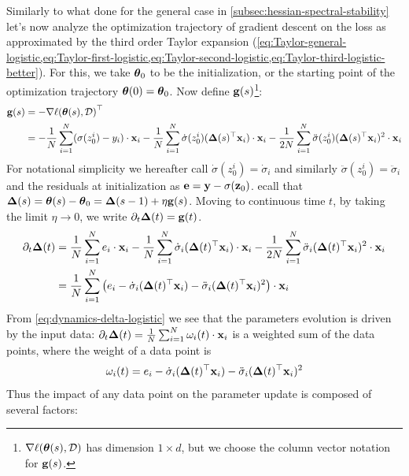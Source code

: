 \documentclass{article} %
\begin{document}
Similarly to what done for the general case in \cref{subsec:hessian-spectral-stability} let's now analyze the optimization trajectory of gradient descent on the loss as approximated by the third order Taylor expansion (\cref{eq:Taylor-general-logistic,eq:Taylor-first-logistic,eq:Taylor-second-logistic,eq:Taylor-third-logistic-better}). For this, we take $\mbox{$\mbox{$\boldsymbol{\theta}$}$}_0$ to be the initialization, or the starting point of the optimization trajectory $\mbox{$\mbox{$\boldsymbol{\theta}$}$}(0) = \mbox{$\mbox{$\boldsymbol{\theta}$}$}_0$. Now define $\mbox{$\mbox{$\mathbf{g}$}$}(s)$\footnote{$\nabla{\ell(\mbox{$\mbox{$\boldsymbol{\theta}$}$}(s),\mbox{${\cal D}$})}$ has dimension $1\times d$, but we choose the column vector notation for $\mbox{$\mbox{$\mathbf{g}$}$}(s)$.}: 
\begin{align}
    \mbox{$\mbox{$\mathbf{g}$}$}(s) 
    &= -\nabla{\ell(\mbox{$\mbox{$\boldsymbol{\theta}$}$}(s),\mbox{${\cal D}$})}^\top \nonumber\\
    &= -\frac{1}{N} \sum_{i=1}^N (\sigma(z^i_0)-y_i) \cdot \mbox{$\mbox{$\mathbf{x}$}$}_i - \frac{1}{N} \sum_{i=1}^N \dot\sigma(z_0^i) (\mbox{$\mbox{$\boldsymbol{\Delta}$}$}(s)^\top \mbox{$\mbox{$\mathbf{x}$}$}_i) \cdot \mbox{$\mbox{$\mathbf{x}$}$}_i - \frac{1}{2N} \sum_{i=1}^N \ddot\sigma(z_0^i)  (\mbox{$\mbox{$\boldsymbol{\Delta}$}$}(s)^\top \mbox{$\mbox{$\mathbf{x}$}$}_i)^2 \cdot \mbox{$\mbox{$\mathbf{x}$}$}_i \nonumber
\end{align}
For notational simplicity we hereafter call $\dot\sigma(z_0^i) = \dot\sigma_i$ and similarly $\ddot\sigma(z_0^i) = \ddot\sigma_i$ and the residuals at initialization as $\mbox{$\mbox{$\mathbf{e}$}$} = \mbox{$\mbox{$\mathbf{y}$}$} - \sigma(\mbox{$\mbox{$\mathbf{z}$}$}_0)$. ecall that $\mbox{$\mbox{$\boldsymbol{\Delta}$}$}(s) = \mbox{$\mbox{$\boldsymbol{\theta}$}$}(s) - \mbox{$\mbox{$\boldsymbol{\theta}$}$}_0 = \mbox{$\mbox{$\boldsymbol{\Delta}$}$}(s-1) + \eta \mbox{$\mbox{$\mathbf{g}$}$}(s)$. Moving to continuous time $t$, by taking the limit $\eta \to 0$, we write $\partial_t\mbox{$\mbox{$\boldsymbol{\Delta}$}$}(t) = \mbox{$\mbox{$\mathbf{g}$}$}(t)$.
\begin{align}
    \partial_t \vDelta(t)  
    &= \frac{1}{N} \sum_{i=1}^N e_i \cdot \vx_i - \frac{1}{N} \sum_{i=1}^N \dot\sigma_i (\vDelta(t)^\top \vx_i) \cdot \vx_i - \frac{1}{2N} \sum_{i=1}^N \ddot\sigma_i  (\vDelta(t)^\top \vx_i)^2 \cdot \vx_i \nonumber \\
\label{eq:dynamics-delta-logistic}
    &= \frac{1}{N} \sum_{i=1}^N \rnd{e_i - \dot\sigma_i (\vDelta(t)^\top \vx_i) - \ddot\sigma_i  (\vDelta(t)^\top \vx_i)^2}\cdot \vx_i
\end{align}
From \cref{eq:dynamics-delta-logistic} we see that the parameters evolution is driven by the input data:  $\partial_t \mbox{$\mbox{$\boldsymbol{\Delta}$}$}(t)= \frac{1}{N} \sum_{i=1}^N \omega_i(t) \cdot \mbox{$\mbox{$\mathbf{x}$}$}_i$ is a weighted sum of the data points, where the weight of a data point is
\begin{equation}
\label{eq:weight-dynamics-delta-datapoint}
    \omega_i(t) = e_i - \dot\sigma_i (\vDelta(t)^\top \vx_i) - \ddot\sigma_i  (\vDelta(t)^\top \vx_i)^2
\end{equation}
\newpage
Thus the impact of any data point on the parameter update is composed of several factors: 
\end{document}
